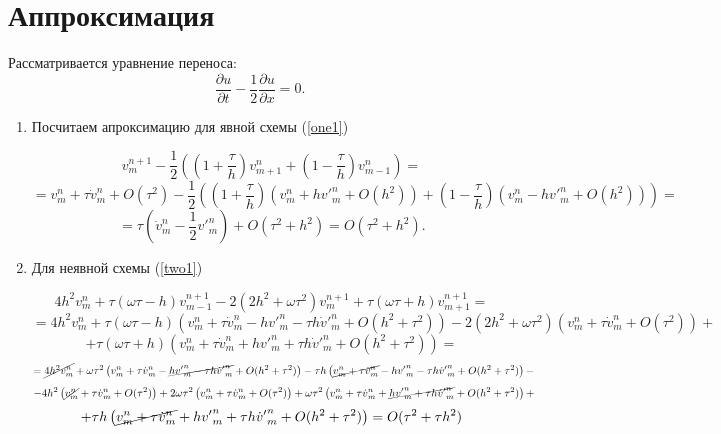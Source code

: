 \newpage
\section{Аппроксимация}

Рассматривается уравнение переноса:
\[
\frac{\partial u}{\partial t} - \frac{1}{2}
\frac{\partial u}{\partial x} = 0.
\] 

\begin{enumerate}
\item Посчитаем апроксимацию для явной схемы (\ref{one1})

\[
v_m^{n+1} - \frac{1}{2} \left( \left(1 + \frac{\tau}{h} \right)v^n_{m+1} + \left(1 - \frac{\tau}{h} \right)v^n_{m-1}  \right) =
\]
\[
= v_m^n + \tau {\dot v}_m^n + O(\tau^2) - \frac{1}{2} \left( \left(1 + \frac{\tau}{h} \right)\left(v_m^n + h {v'}_m^n + O(h^2)\right) +\left(1 - \frac{\tau}{h} \right) \left(v_m^n - h {v'}_m^n + O(h^2) \right)  \right) = 
\]
\[
 = \tau \left({\dot v}_m^n    - \frac{1}{2}  {v'}_m^n \right) + O(\tau^2+h^2) = O(\tau^2+h^2).
\]

\item Для неявной схемы (\ref{two1})

\[
4h^2 v_m^n + \tau
\left(\omega \tau -h \right) v_{m-1}^{n+1} -
2\left(2h^2 + \omega \tau^2\right) v_{m}^{n+1} +
\tau \left( \omega \tau + h \right) v_{m+1}^{n+1} = 
\]
\[
=4h^2 v_m^n
+  \tau \left(\omega \tau -h \right) \left(v_m^n+ \tau {\dot v}_m^n - h {v'}_m^n - \tau h {\dot v'}_m^n + O(h^2 + \tau^2)\right)
- 2\left(2h^2 + \omega \tau^2\right) \left( v_m^n+ \tau{\dot v}_m^n + O(\tau^2)\right) +\]
\[
+ \tau \left( \omega \tau + h \right) \left(v_m^n+ \tau {\dot v}_m^n + h {v'}_m^n + \tau h {\dot v'}_m^n + O(h^2 + \tau^2)\right)
= 
\]
\[
=\cancel{4h^2 v_m^n}
+  \omega \tau^2  \left(v_m^n+ \tau {\dot v}_m^n - \cancel{h {v'}_m^n - \tau h {\dot v'}_m^n} + O(h^2 + \tau^2)\right)
- \tau h   \left(\cancel{v_m^n+ \tau {\dot v}_m^n}   -  h {v'}_m^n - \tau h {\dot v'}_m^n + O(h^2 + \tau^2)\right) - 
\]
\[
- 4h^2 \left( \cancel{v_m^n} + \tau{\dot v}_m^n + O(\tau^2)\right) + 2\omega \tau^2\left( v_m^n+ \tau{\dot v}_m^n + O(\tau^2)\right) 
+ \omega \tau^2 \left(v_m^n+ \tau {\dot v}_m^n + \cancel{h {v'}_m^n + \tau h {\dot v'}_m^n} + O(h^2 + \tau^2)\right) +
\]
\[
+
\tau h \left(\cancel{v_m^n+ \tau {\dot v}_m^n} + h {v'}_m^n + \tau h {\dot v'}_m^n + O(h^2 + \tau^2)\right)
= O(\tau^2 + \tau h^2)
\]

\end{enumerate}



